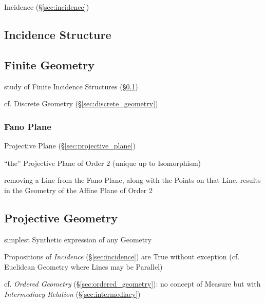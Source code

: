 Incidence (\S\ref{sec:incidence})



\subsection{Incidence Structure}\label{sec:incidence_structure}

\subsection{Finite Geometry}\label{sec:finite_geometry}

study of Finite Incidence Structures (\S\ref{sec:incidence_structure})

cf. Discrete Geometry (\S\ref{sec:discrete_geometry})



\subsubsection{Fano Plane}\label{sec:fano_plane}

Projective Plane (\S\ref{sec:projective_plane})

``the'' Projective Plane of Order $2$ (unique up to Isomorphism)

removing a Line from the Fano Plane, along with the Points on that Line, results
in the Geometry of the Affine Plane of Order 2



\subsection{Projective Geometry}\label{sec:projective_geometry}

simplest Synthetic expression of any Geometry

Propositions of \emph{Incidence} (\S\ref{sec:incidence}) are True without
exception (cf. Euclidean Geometry where Lines may be Parallel)

\fist cf. \emph{Ordered Geometry} (\S\ref{sec:ordered_geometry}): no concept of
Measure but with \emph{Intermediacy Relation} (\S\ref{sec:intermediacy})

